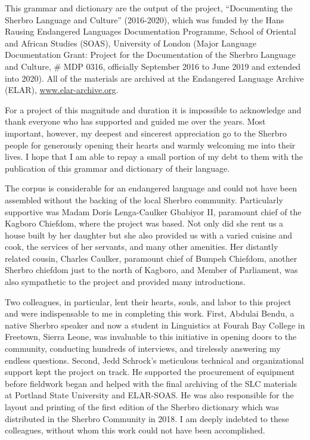 \addchap{\lsAcknowledgementTitle} 




This grammar and dictionary are the output of the project, “Documenting the Sherbro Language and Culture” (2016-2020), which was funded by the Hans Rausing Endangered Languages Documentation Programme, School of Oriental and African Studies (SOAS), University of London (Major Language Documentation Grant: Project for the Documentation of the Sherbro Language and Culture, \# MDP 0316, officially  {September 2016} to  {June 2019} and extended into 2020). All of the materials are archived at the Endangered Language Archive (ELAR), \href{http://www.elar-archive.org}{{www.elar-archive.org}}.

For a project of this magnitude and duration it is impossible to acknowledge and thank everyone who has supported and guided me over the years. Most important, however, my deepest and sincerest appreciation go to the Sherbro people for generously opening their hearts and warmly welcoming me into their lives. I hope that I am able to repay a small portion of my debt to them with the publication of this grammar and dictionary of their language.

The corpus is considerable for an endangered language and could not have been assembled without the backing of the local Sherbro community. Particularly supportive was Madam Doris Lenga-Caulker Gbabiyor II, paramount chief of the Kagboro Chiefdom, where the project was based. Not only did she rent us a house built by her daughter but she also provided us with a varied cuisine and cook, the services of her servants, and many other amenities. Her distantly related cousin, Charles Caulker, paramount chief of Bumpeh Chiefdom, another Sherbro chiefdom just to the north of Kagboro, and Member of Parliament, was also sympathetic to the project and provided many introductions.

Two colleagues, in particular, lent their hearts, souls, and labor to this project and were indispensable to me in completing this work. First, Abdulai Bendu, a native Sherbro speaker and now a student in Linguistics at Fourah Bay College in Freetown, Sierra Leone, was invaluable to this initiative in opening doors to the community, conducting hundreds of interviews, and tirelessly answering my endless questions. Second, Jedd Schrock's meticulous technical and organizational support kept the project on track. He supported the procurement of equipment before fieldwork began and helped with the final archiving of the SLC materials at Portland State University and ELAR-SOAS. He was also responsible for the layout and printing of the first edition of the Sherbro dictionary which was distributed in the Sherbro Community in 2018. I am deeply indebted to these colleagues, without whom this work could not have been accomplished.

